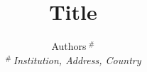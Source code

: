 \documentclass{vldb}
\title{Title}
\author{
{Authors{\small $~^{\#}$} } %
\vspace{1.6mm}\\
\fontsize{10}{10}\selectfont\itshape
$^{\#}$\,Institution, Address, Country
}
\begin{document}
\maketitle








%
%
%
%
%








\bgroup\small

\let\xxx=\bibitem\def\bibitem{\par\vspace{0.0mm}\xxx}

\egroup
\end{document}

